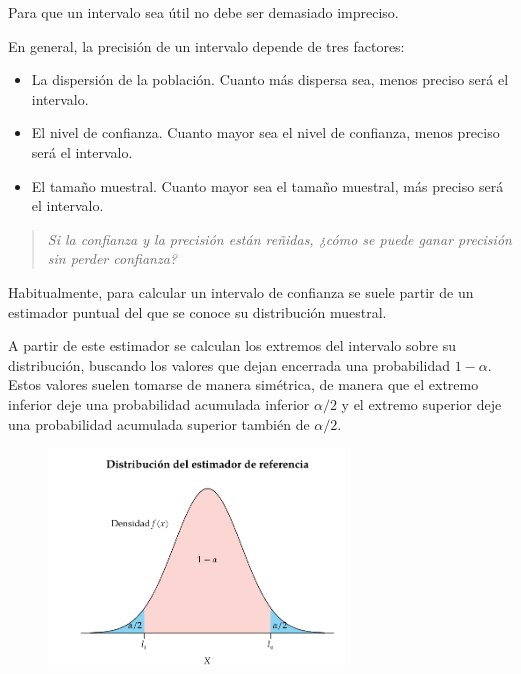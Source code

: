 \documentclass[
  a4paper,
]{scrreport}
\theoremstyle{plain}
\theoremstyle{definition}
\theoremstyle{definition}
\theoremstyle{remark}
\begin{document}
Para que un intervalo sea útil no debe ser demasiado impreciso.

En general, la precisión de un intervalo depende de tres factores:

\begin{itemize}
\item
  La dispersión de la población. Cuanto más dispersa sea, menos preciso
  será el intervalo.
\item
  El nivel de confianza. Cuanto mayor sea el nivel de confianza, menos
  preciso será el intervalo.
\item
  El tamaño muestral. Cuanto mayor sea el tamaño muestral, más preciso
  será el intervalo.
\end{itemize}

\begin{quote}
\emph{Si la confianza y la precisión están reñidas, ¿cómo se puede ganar
precisión sin perder confianza?}
\end{quote}

Habitualmente, para calcular un intervalo de confianza se suele partir
de un estimador puntual del que se conoce su distribución muestral.

A partir de este estimador se calculan los extremos del intervalo sobre
su distribución, buscando los valores que dejan encerrada una
probabilidad \(1-\alpha\). Estos valores suelen tomarse de manera
simétrica, de manera que el extremo inferior deje una probabilidad
acumulada inferior \(\alpha/2\) y el extremo superior deje una
probabilidad acumulada superior también de \(\alpha/2\).

\begin{figure}

{\centering \includegraphics[width=0.7\textwidth,height=\textheight]{img/estimacion/extremos-intervalos.pdf}

}

\end{figure}
\end{document}
